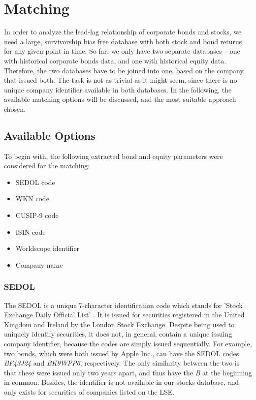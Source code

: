\chapter{Matching} \label{chapter:matching}
In order to analyze the lead-lag relationship of corporate bonds and stocks, we need a large, survivorship bias free database with both stock and bond returns for any given point in time. So far, we only have two separate databases -- one with historical corporate bonds data, and one with historical equity data. Therefore, the two databases have to be joined into one, based on the company that issued both. The task is not as trivial as it might seem, since there is no unique company identifier available in both databases. In the following, the available matching options will be discussed, and the most suitable approach chosen. 

\section{Available Options} \label{section:available-options}
To begin with, the following extracted bond and equity parameters were considered for the matching: 
\begin{itemize}
	\item SEDOL code
	\item WKN code
	\item CUSIP-9 code
	\item ISIN code
	\item Worldscope identifier
	\item Company name
\end{itemize}

\subsection{SEDOL}
The SEDOL is a unique 7-character identification code which stands for 'Stock Exchange Daily Official List' \cite{sedol}. It is issued for securities registered in the United Kingdom and Ireland by the London Stock Exchange. Despite being used to uniquely identify securities, it does not, in general, contain a unique issuing company identifier, because the codes are simply issued sequentially. For example, two bonds, which were both issued by Apple Inc., can have the SEDOL codes \textit{BF43J24} and \textit{BK9WPP6}, respectively. The only similarity between the two is that these were issued only two years apart, and thus have the \textit{B} at the beginning in common. Besides, the identifier is not available in our stocks database, and only exists for securities of companies listed on the LSE. 

